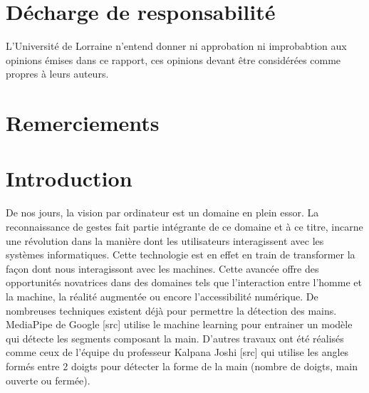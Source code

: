 \documentclass[11pt]{article}
\begin{document}
\newpage \newpage
\section*{Décharge de responsabilité }\bigbreak
L'Université de Lorraine n'entend donner ni approbation  ni improbabtion aux opinions émises dans ce rapport,
ces opinions devant être considérées comme propres à leurs auteurs. \bigbreak

\newpage
\section*{Remerciements}

\newpage
\tableofcontents
\newpage

\setcounter{page}{1}
\section*{Introduction}
De nos jours, la vision par ordinateur est un domaine en plein essor. La reconnaissance de gestes fait partie intégrante de ce domaine et à ce titre, incarne une révolution dans la manière dont les utilisateurs interagissent avec les systèmes informatiques. Cette technologie est en effet en train de transformer la façon dont nous interagissont avec les machines. Cette avancée offre des opportunités novatrices dans des domaines tels que l'interaction entre l'homme et la machine,
la réalité augmentée ou encore l'accessibilité numérique.
De nombreuses techniques existent déjà pour permettre la détection des mains. MediaPipe de Google [src] utilise le machine learning pour entrainer un modèle qui détecte les segments composant la main. D'autres travaux ont été réalisés comme ceux de l'équipe du professeur Kalpana Joshi [src] qui utilise les angles formés entre 2 doigts pour détecter la forme de la main (nombre de doigts, main ouverte ou fermée).\bigbreak
\end{document}
